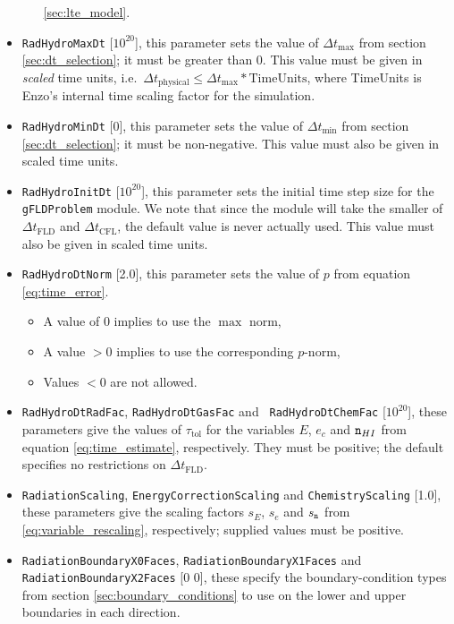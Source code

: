 \documentclass[letterpaper,10pt]{article}
\renewcommand{\(}{\left(}
\renewcommand{\)}{\right)}
\newcommand{\dt}{\Delta t}
\newcommand{\mn}{{\tt n}}
\begin{document}
\begin{itemize}
\begin{itemize}
    \ref{sec:lte_model}.
  \end{itemize}
\item {\tt RadHydroMaxDt} [$10^{20}$], this parameter sets the value of
  $\dt_{\text{max}}$ from section \ref{sec:dt_selection}; it must be
  greater than 0.  This value must be given in {\em scaled} time units,   
  i.e.~$\dt_{\text{physical}} \le \dt_{\text{max}}*\text{TimeUnits}$, 
  where TimeUnits is Enzo's internal time scaling factor for the simulation.
\item {\tt RadHydroMinDt} [0], this parameter sets the value of
  $\dt_{\text{min}}$ from section \ref{sec:dt_selection}; it must be
  non-negative.  This value must also be given in scaled time
  units.
\item {\tt RadHydroInitDt} [$10^{20}$], this parameter sets the initial
  time step size for the {\tt gFLDProblem} module.  We note that since
  the module will take the smaller of $\dt_{\text{FLD}}$ and
  $\dt_{\text{CFL}}$, the default value is never actually used.  This
  value must also be given in scaled time units.
\item {\tt RadHydroDtNorm} [2.0], this parameter sets the value
  of $p$ from equation \eqref{eq:time_error}.  
  \begin{itemize}
  \item A value of $0$ implies to use the $\max$ norm, 
  \item A value $>0$ implies to use the corresponding $p$-norm,
  \item Values $<0$ are not allowed.
  \end{itemize}
\item {\tt RadHydroDtRadFac}, {\tt RadHydroDtGasFac} and {\tt
    RadHydroDtChemFac}  [$10^{20}$], these parameters give the values
  of $\tau_{\text{tol}}$ for the variables $E$, $e_c$ and $\mn_{HI}$
  from equation \eqref{eq:time_estimate}, respectively.  They must be
  positive; the default specifies no restrictions on $\dt_{\text{FLD}}$.
\item {\tt RadiationScaling}, {\tt EnergyCorrectionScaling} and 
  {\tt ChemistryScaling} [1.0], these parameters give the scaling 
  factors $s_E$, $s_e$ and $s_{\mn}$ from
  \eqref{eq:variable_rescaling}, respectively; supplied values must be
  positive. 
\item {\tt RadiationBoundaryX0Faces}, {\tt RadiationBoundaryX1Faces}
  and {\tt RadiationBoundaryX2Faces} [0 0], these specify the
  boundary-condition types from section \ref{sec:boundary_conditions}
  to use on the lower and upper boundaries in each direction.

\end{itemize}
\end{document}
